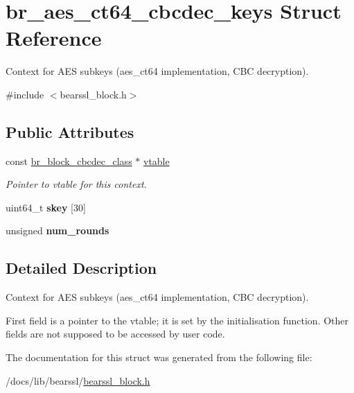 \hypertarget{structbr__aes__ct64__cbcdec__keys}{}\section{br\+\_\+aes\+\_\+ct64\+\_\+cbcdec\+\_\+keys Struct Reference}
\label{structbr__aes__ct64__cbcdec__keys}


Context for A\+ES subkeys ({\ttfamily aes\+\_\+ct64} implementation, C\+BC decryption).  




{\ttfamily \#include $<$bearssl\+\_\+block.\+h$>$}

\subsection*{Public Attributes}
\begin{DoxyCompactItemize}
\item 
\mbox{\label{structbr__aes__ct64__cbcdec__keys_a43a346c9f307096b8e7671f6798a27ab}} 
const \hyperlink{bearssl__block_8h_a5542970c820eeee2e62766368be8fb7f}{br\+\_\+block\+\_\+cbcdec\+\_\+class} $\ast$ \hyperlink{structbr__aes__ct64__cbcdec__keys_a43a346c9f307096b8e7671f6798a27ab}{vtable}
\begin{DoxyCompactList}\small\item\em Pointer to vtable for this context. \end{DoxyCompactList}\item 
\mbox{\label{structbr__aes__ct64__cbcdec__keys_a41e6173dd1367856fd3116beed30004c}} 
uint64\+\_\+t {\bfseries skey} \mbox{[}30\mbox{]}
\item 
\mbox{\label{structbr__aes__ct64__cbcdec__keys_a76459cac779d178193ee9abf431b05a6}} 
unsigned {\bfseries num\+\_\+rounds}
\end{DoxyCompactItemize}


\subsection{Detailed Description}
Context for A\+ES subkeys ({\ttfamily aes\+\_\+ct64} implementation, C\+BC decryption). 

First field is a pointer to the vtable; it is set by the initialisation function. Other fields are not supposed to be accessed by user code. 

The documentation for this struct was generated from the following file\+:\begin{DoxyCompactItemize}
\item 
/docs/lib/bearssl/\hyperlink{bearssl__block_8h}{bearssl\+\_\+block.\+h}\end{DoxyCompactItemize}
